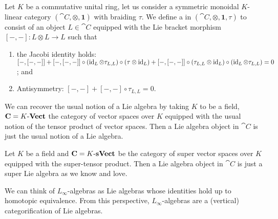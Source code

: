 \begin{node}\label{hda-0005}%
\begin{definition}\label{hda-0004}%
Let $K$ be a commutative unital ring, let us consider a symmetric monoidal
$K$-linear category $(\cat{C},\otimes,\mathbf{1})$ with braiding $\tau$.
We define a  in $(\cat{C},\otimes,\mathbf{1},\tau)$
to consist of an object $L\in\cat{C}$ equipped with the Lie bracket
morphism $[-,-]\colon L\otimes L\to L$ such that
\begin{enumerate}
\item the Jacobi identity holds: $\left[-,\left[-,-\right]\right]
+ \left[-,\left[-,-\right]\right]\circ(\operatorname{id}_{L}\otimes\tau_{L,L})\circ(\tau\otimes \operatorname{id}_{L})
+ \left[-,\left[-,-\right]\right] \circ (\tau_{L,L}\otimes \operatorname{id}_{L})\circ (\operatorname{id}_{L}\otimes\tau_{L,L}) = 0$;
and
\item Antisymmetry: $[-,-]+[-,-]\circ \tau_{L,L}=0$.
\end{enumerate}
\end{definition}
\begin{node}\label{hda-0006}%
We can recover the usual notion of a Lie algebra by taking $K$ to be a
field, $\mathbf{C}=K\textrm{-}\mathbf{Vect}$ the category of vector spaces over $K$
equipped with the usual notion of the tensor product of vector
spaces. Then a Lie algebra object in $\cat{C}$ is just the usual notion
of a Lie algebra.
\end{node}
\begin{node}\label{hda-0007}%
Let $K$ be a field and $\mathbf{C}=K\textrm{-}\mathbf{sVect}$ be the category of super
vector spaces over $K$ equipped with the super-tensor product. Then a
Lie algebra object in $\cat{C}$ is just a super Lie algebra as we know
and love.
\end{node}
\begin{node}[Generalizations]\label{hda-0008}%
We can think of $L_{\infty}$-algebras as Lie algebras whose identities
hold up to homotopic equivalence. From this perspective,
$L_{\infty}$-algebras are a (vertical) categorification of Lie algebras.
\end{node}
\end{node}

